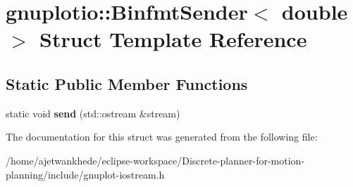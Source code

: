 \hypertarget{structgnuplotio_1_1BinfmtSender_3_01double_01_4}{}\section{gnuplotio\+:\+:Binfmt\+Sender$<$ double $>$ Struct Template Reference}
\label{structgnuplotio_1_1BinfmtSender_3_01double_01_4}
\subsection*{Static Public Member Functions}
\begin{DoxyCompactItemize}
\item 
\mbox{\label{structgnuplotio_1_1BinfmtSender_3_01double_01_4_a455b75492a6a86398374d14a2bfc7238}} 
static void {\bfseries send} (std\+::ostream \&stream)
\end{DoxyCompactItemize}


The documentation for this struct was generated from the following file\+:\begin{DoxyCompactItemize}
\item 
/home/ajetwankhede/eclipse-\/workspace/\+Discrete-\/planner-\/for-\/motion-\/planning/include/gnuplot-\/iostream.\+h\end{DoxyCompactItemize}
